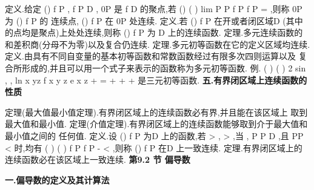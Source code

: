 \textcolor{lyred}{定义}.给定
()
f P ,
f
P
D
\in 
,
0P 是
f
D 的聚点,若
()
(
)
lim
P
P f P
f P
\to 
=
,则称
0P 为
()
f P 的 
\textcolor{lyred}{连续点},
()
f P 在
0P 处\textcolor{lyred}{连续}. 
\textcolor{lyred}{定义}.若
()
f P 在开或者闭区域D (其中的点均是聚点)上处处连续,则称
()
f P 为 
D 上的\textcolor{lyred}{连续函数}. 
\textcolor{lyred}{定理}.多元连续函数的和差积商(分母不为零)以及复合仍连续. 
\textcolor{lyred}{定理}.多元初等函数在它的定义区域均连续. 
\textcolor{lyred}{定义}.由具有不同自变量的基本初等函数和常数函数经过有限多次四则运算以及 
复合所形成的,并且可以用一个式子来表示的函数称为\textcolor{lyred}{多元初等函数}. 
\textcolor{lyred}{例}.
(
)
(
)
2 sin
, ,
ln
x
yz
f x y z
e
x
z
+
=
+
+
+
是三元初等函数. 
\vspace{4pt}
{\bfseries \textcolor{lyred}{五.有界闭区域上连续函数的性质}}

\textcolor{lyred}{定理(最大值最小值定理)}.有界闭区域上的连续函数必有界,并且能在该区域上 
取到最大值和最小值. 
\textcolor{lyred}{定理(介值定理)}.有界闭区域上的连续函数能够取到介于最大值和最小值之间的 
任何值. 
\textcolor{lyred}{定义}.设
()
f P 为D 上的函数,若
\varepsilon 
\forall >
,
\delta 
\exists 
>
,当
,
P P
D
\in 
,且
PP
\delta 
<
时,均有 
(
)
(
)
f P
f P
\varepsilon 
-
<
,则称
()
f P 在D 上\textcolor{lyred}{一致连续}. 
\textcolor{lyred}{定理}.有界闭区域上的连续函数必在该区域上一致连续. 
\vspace{6pt}
{\large \bfseries \textcolor{lyred}{第9.2 节 偏导数}}

\vspace{4pt}
{\bfseries \textcolor{lyred}{一.偏导数的定义及其计算法}}

